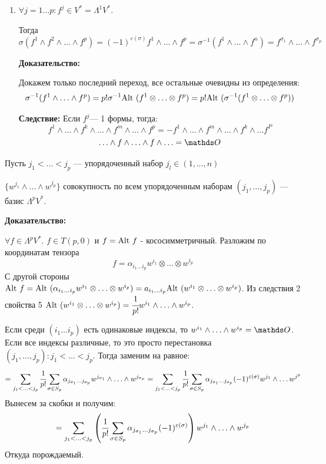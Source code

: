 \begin{enumerate}
    \item $\forall j=1\ldots p : f^j \in V^*= \Lambda^1V^*$.
    
    Тогда $$\sigma(f^1 \wedge f^2 \wedge \ldots\wedge  f^p) = (-1)^{\varepsilon(\sigma)}f^1\wedge \ldots \wedge f^p = \sigma^{-1}(f^1\wedge \ldots \wedge f^n) = f^{\sigma_1}\wedge \ldots \wedge f^{\sigma_p}$$

    \textbf{Доказательство:}

    Докажем только последний переход, все остальные очевидны из определения:
    $$\sigma^{-1}(f^1 \wedge \ldots \wedge f^p ) = p! \sigma^{-1}\text{Alt } (f^1 \otimes \ldots \otimes f^p ) =p!\text{Alt } (\sigma^{-1}(f^1 \otimes \ldots \otimes f^p)) $$

    \textbf{Следствие:} Если $f^j$--- 1 формы, тогда:
    $$f^1 \wedge \ldots \wedge f^k \wedge \ldots \wedge f^m \wedge \ldots \wedge f^p = -f^1 \wedge \ldots \wedge f^m \wedge \ldots \wedge f^k \wedge \ldots f^P$$
    $$\ldots \wedge f \wedge \ldots \wedge f \wedge \ldots = \zero$$
\end{enumerate}


Пусть $j_1 < \ldots  < j_p$ --- упорядоченный набор $j_l \in (1,\ldots,n)$

$\{w^{j_1}\wedge \ldots \wedge w^{j_p}\}$ совокупность по всем упорядоченным наборам $(j_1,\ldots, j_p)$ --- базис $\Lambda^pV^*$.

\textbf{Доказательство:}


$\forall f \in \Lambda^p V^*$. $f\in T(p,0)$ и $f = \text{Alt } f$ - кососимметричный. Разложим по координатам тензора
$$f= \alpha_{i_1\ldots i_p} w^{i_1}\otimes \ldots \otimes w^{i_p}$$
С другой стороны $\text{Alt } f = \text{Alt } (\alpha_{i_1\ldots i_p}w^{i_1}\otimes  \ldots \otimes w^{i_p}) = a_{i_1\ldots i_p}\text{Alt } (w^{i_1}\otimes \ldots \otimes w^{i_p})$. Из следствия 2 свойства 5 $\text{Alt } (w^{i_1}\otimes \ldots \otimes w^{i_p}) = \cfrac{1}{p!}w^{i_1}\wedge \ldots \wedge w^{i_p}$. 

Если среди $(i_1\ldots i_p)$ есть одинаковые индексы, то $w^{i_1} \wedge \ldots \wedge w^{i_p} = \zero$. Если все индексы различные, то это просто перестановка $(j_1,\ldots,j_p): j_1<\ldots <j_p$. Тогда заменим на равное:
$$=\sum_{j_1<\ldots<j_p}\cfrac{1}{p!}\sum\limits_{\sigma \in S_p} \alpha_{j_{\sigma_1}\ldots j_{\sigma_p}} w^{j_{\sigma_1}}\wedge \ldots \wedge w^{j_{\sigma_p}} = \sum_{j_1<\ldots<j_p}\cfrac{1}{p!}\sum\limits_{\sigma \in S_p} \alpha_{j_{\sigma_1}\ldots j_{\sigma_p}} (-1)^{\varepsilon(\sigma)}w^{j_1}\wedge \ldots w^{j^p}$$
Вынесем за скобки и получим:
$$=\sum_{j_1<\ldots<j_p}\left(\cfrac{1}{p!}\sum\limits_{\sigma \in S_p}\alpha_{j_{\sigma_1}\ldots j_{\sigma_p}}(-1)^{\varepsilon(\sigma)}\right)w^{j_1}\wedge \ldots \wedge w^{j_p}$$
Откуда порождаемый.

